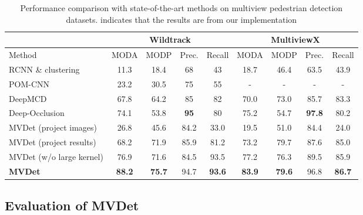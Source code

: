 \documentclass[runningheads]{llncs}
\begin{document}
\begin{table}[t]
\centering
\caption{Performance comparison with state-of-the-art methods on multiview pedestrian detection datasets.  indicates that the results are from our implementation }
\begin{tabular}{l||c|c|c|c||c|c|c|c}
\toprule
                        & \multicolumn{4}{c||}{Wildtrack}                              & \multicolumn{4}{c}{MultiviewX}                               \\ \hline
Method                  & MODA          & MODP          & Prec.   & Recall        & MODA          & MODP          & Prec.     & Recall        \\ \hline
RCNN \& clustering      & 11.3          & 18.4          & 68          & 43            & 18.7          & 46.4          & 63.5          & 43.9          \\ \hline
POM-CNN                 & 23.2          & 30.5          & 75          & 55            & -             & -             & -             & -             \\ \hline
DeepMCD                 & 67.8          & 64.2          & 85          & 82            & 70.0          & 73.0          & 85.7          & 83.3          \\ \hline
Deep-Occlusion          & 74.1          & 53.8          & \textbf{95} & 80            & 75.2          & 54.7          & \textbf{97.8} & 80.2          \\ \hline\hline
MVDet (project images)        & 26.8          & 45.6          & 84.2        & 33.0          & 19.5          & 51.0          & 84.4          & 24.0          \\ \hline
MVDet (project results)       & 68.2          & 71.9          & 85.9        & 81.2          & 73.2          & 79.7          & 87.6          & 85.0          \\ \hline
MVDet (w/o large kernel) & 76.9          & 71.6          & 84.5        & 93.5          & 77.2          & 76.3          & 89.5          & 85.9 \\  \hline
\textbf{MVDet} & \textbf{88.2} & \textbf{75.7} & 94.7        & \textbf{93.6} & \textbf{83.9} & \textbf{79.6} & 96.8          & \textbf{86.7}          \\
\bottomrule
\end{tabular}
\label{tab:sota}
\end{table}


\subsection{Evaluation of MVDet}
\label{sec:sec:evaluation}
\end{document}
